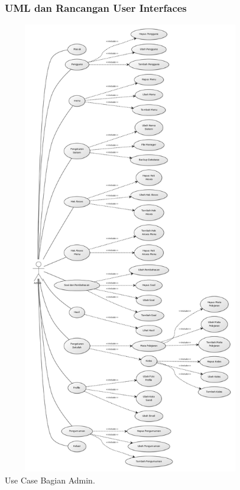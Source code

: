 \documentclass{scrreprt}
\begin{document}
		
		\begin{figure}
			\subsubsection{UML dan Rancangan User Interfaces}
			\includegraphics[width=18cm, height=20cm]{usecase-admin.jpg}
			\caption{Use Case Bagian Admin.}
		\end{figure}
	
\end{document}
